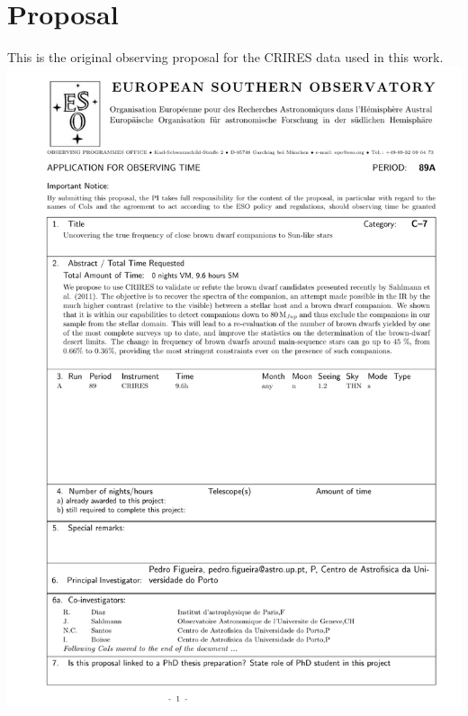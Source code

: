 \section{Proposal}\label{appendix:proposal}
This is the original observing proposal for the CRIRES data used in this work.
{\centering
    {\includegraphics[width=.95\textwidth, keepaspectratio=true, page = 1, trim = 1cm 1cm 1cm 0cm, clip = true]{appendices/proposal_grayscale.pdf}}
}
